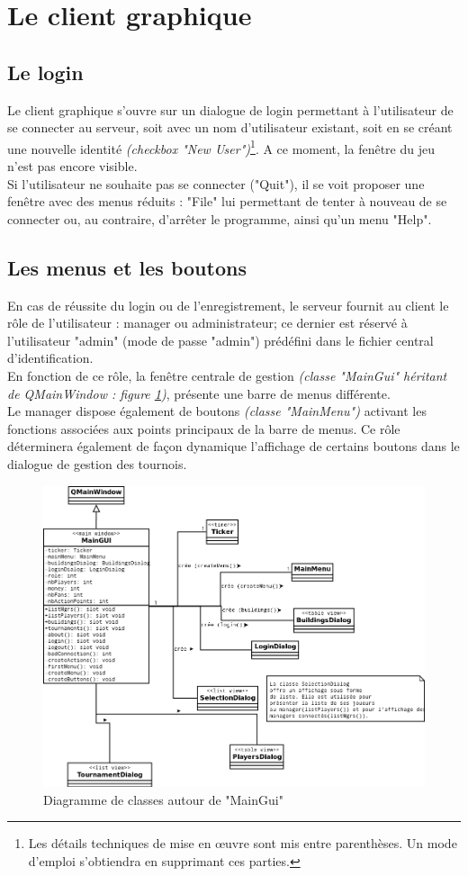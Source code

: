 \documentclass[a4paper,titlepage]{scrreprt}
\begin{document}
\section{Le client graphique} \label{diag-client-graphique}
\subsection{Le login}
Le client graphique s'ouvre sur un dialogue de login permettant à l'utilisateur de se connecter au serveur,
soit avec un nom d'utilisateur existant, soit en se créant une nouvelle identité \emph{(checkbox "New User")}\footnote{Les détails techniques de mise en \oe uvre sont mis entre parenthèses.
Un mode d'emploi s'obtiendra en supprimant ces parties.}.
A ce moment, la fenêtre du jeu n'est pas encore visible.\\
Si l'utilisateur ne souhaite pas se connecter ("Quit"), il se voit proposer une fenêtre avec
des menus réduits : "File" lui permettant de tenter à nouveau de se connecter ou, au contraire,
d'arrêter le programme, ainsi qu'un menu "Help".

\subsection{Les menus et les boutons}
En cas de réussite du login ou de l'enregistrement, le serveur fournit au client le rôle
de l'utilisateur : manager ou administrateur; ce dernier est réservé à l'utilisateur
"admin" (mode de passe "admin") prédéfini dans le fichier central d'identification.\\
En fonction de ce rôle, la fenêtre centrale de gestion \emph{(classe "MainGui" héritant de QMainWindow
: figure \ref{mainGUI})},
présente une barre de menus différente.\\
Le manager dispose également de boutons
\emph{(classe "MainMenu")} activant les fonctions associées aux points principaux de la barre de menus.
Ce rôle déterminera également de façon dynamique l'affichage de certains boutons dans le dialogue
de gestion des tournois.
    \begin{figure}[H]
    \center
    \includegraphics[scale=0.4]{uml/class/mainGUI.png}
    \caption{Diagramme de classes autour de "MainGui"} \label{mainGUI}
    \end{figure}
\end{document}
